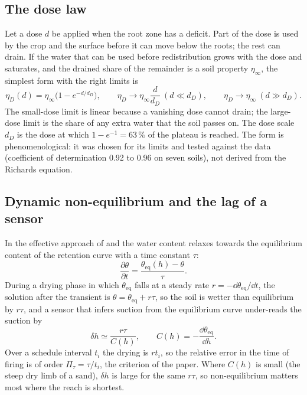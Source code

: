 \subsection{The dose law}
Let a dose $d$ be applied when the root zone has a deficit. Part of the dose is used by the crop and the surface before it can move below the roots; the rest can drain. If the water that can be used before redistribution grows with the dose and saturates, and the drained share of the remainder is a soil property $\eta_\infty$, the simplest form with the right limits is
\begin{equation}
\eta_D(d)=\eta_\infty\bigl(1-e^{-d/d_D}\bigr),\qquad \eta_D\to\eta_\infty\frac{d}{d_D}\ (d\ll d_D),\qquad \eta_D\to\eta_\infty\ (d\gg d_D). \label{eq:s-dose}
\end{equation}
The small-dose limit is linear because a vanishing dose cannot drain; the large-dose limit is the share of any extra water that the soil passes on. The dose scale $d_D$ is the dose at which $1-e^{-1}=63\,\%$ of the plateau is reached. The form is phenomenological: it was chosen for its limits and tested against the data (coefficient of determination 0.92 to 0.96 on seven soils), not derived from the Richards equation.

\subsection{Dynamic non-equilibrium and the lag of a sensor}
In the effective approach of \citet{RossSmettem2000} and \citet{Diamantopoulos2012WRR} the water content relaxes towards the equilibrium content of the retention curve with a time constant $\tau$:
\begin{equation}
\frac{\partial\theta}{\partial t}=\frac{\theta_{\mathrm{eq}}(h)-\theta}{\tau}.
\end{equation}
During a drying phase in which $\theta_{\mathrm{eq}}$ falls at a steady rate $r=-\dd\theta_{\mathrm{eq}}/\dd t$, the solution after the transient is $\theta=\theta_{\mathrm{eq}}+r\tau$, so the soil is wetter than equilibrium by $r\tau$, and a sensor that infers suction from the equilibrium curve under-reads the suction by
\begin{equation}
\delta h\simeq\frac{r\tau}{C(h)},\qquad C(h)=-\frac{\dd\theta_{\mathrm{eq}}}{\dd h}.
\end{equation}
Over a schedule interval $t_i$ the drying is $rt_i$, so the relative error in the time of firing is of order $\Pi_\tau=\tau/t_i$, the criterion of the paper. Where $C(h)$ is small (the steep dry limb of a sand), $\delta h$ is large for the same $r\tau$, so non-equilibrium matters most where the reach is shortest.

